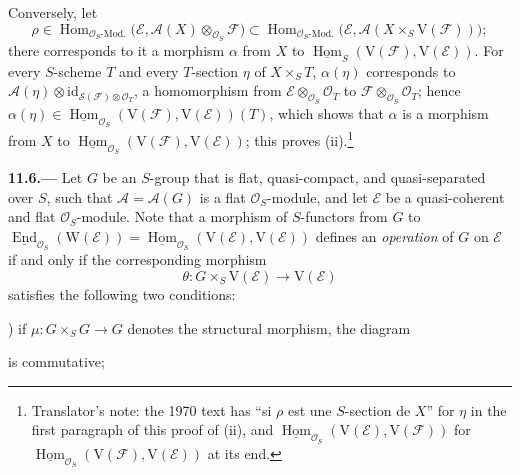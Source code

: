 Conversely, let
\[
  \rho\in\operatorname{Hom}_{\mathcal O_S\text{-Mod.}}
    \bigl(\mathcal E,\mathcal A(X)\otimes_{\mathcal O_S}\mathcal F\bigr)
  \subset\operatorname{Hom}_{\mathcal O_S\text{-Mod.}}
    \bigl(\mathcal E,\mathcal A(X\times_S\mathrm V(\mathcal F))\bigr);
\]
there corresponds to it a morphism \(\alpha\) from \(X\) to
\(\underline{\operatorname{Hom}}_S(\mathrm V(\mathcal F),\mathrm V(\mathcal E))\). For
every \(S\)-scheme \(T\) and every \(T\)-section \(\eta\) of \(X\times_ST\),
\(\alpha(\eta)\) corresponds to
\(\mathcal A(\eta)\otimes\mathrm{id}_{\mathcal S(\mathcal F)\otimes\mathcal O_T}\), a
homomorphism from \(\mathcal E\otimes_{\mathcal O_S}\mathcal O_T\) to
\(\mathcal F\otimes_{\mathcal O_S}\mathcal O_T\); hence
\(\alpha(\eta)\in\underline{\operatorname{Hom}}_{\mathcal O_S}(\mathrm V(\mathcal F),\mathrm V(\mathcal E))(T)\),
which shows that \(\alpha\) is a morphism from \(X\) to
\(\underline{\operatorname{Hom}}_{\mathcal O_S}(\mathrm V(\mathcal F),\mathrm V(\mathcal E))\);
this proves \textup{(ii)}.\footnote{Translator's note: the 1970 text has ``si \(\rho\) est une
\(S\)-section de \(X\)'' for \(\eta\) in the first paragraph of this proof of (ii), and
\(\underline{\operatorname{Hom}}_{\mathcal O_S}(\mathrm V(\mathcal E),\mathrm V(\mathcal F))\) for
\(\underline{\operatorname{Hom}}_{\mathcal O_S}(\mathrm V(\mathcal F),\mathrm V(\mathcal E))\) at its end.}

\medskip
{}\label{par:sga3-VIB-11.6}%
\noindent\textbf{11.6.---}
Let \(G\) be an \(S\)-group that is flat, quasi-compact, and
quasi-separated over \(S\), such that \(\mathcal A=\mathcal A(G)\)
is a flat \(\mathcal O_S\)-module, and let \(\mathcal E\) be a
quasi-coherent and flat \(\mathcal O_S\)-module. Note that a
morphism of \(S\)-functors from \(G\) to
\(\underline{\operatorname{End}}_{\mathcal O_S}(\mathrm W(\mathcal E))
=\underline{\operatorname{Hom}}_{\mathcal O_S}(\mathrm V(\mathcal E),\mathrm V(\mathcal E))\)
defines an \emph{operation} of \(G\) on \(\mathcal E\) if and only
if the corresponding morphism
\[
  \theta:G\times_S\mathrm V(\mathcal E)\longrightarrow\mathrm V(\mathcal E)
\]
satisfies the following two conditions:

\smallskip
{}\label{diag:sga3-VIB-11.6-1}%
) if \(\mu:G\times_SG\to G\) denotes the structural
morphism, the diagram
\begin{center}
\end{center}
is commutative;


